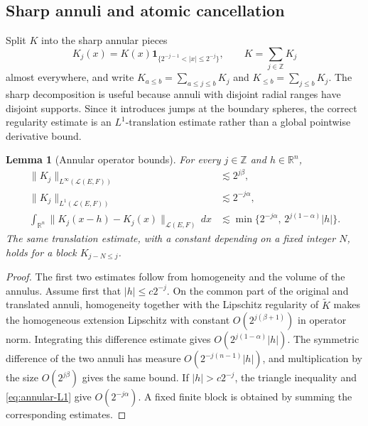 \documentclass[11pt]{amsart}
\numberwithin{equation}{section}
\newtheorem{lemma}[theorem]{Lemma}
\theoremstyle{definition}
\theoremstyle{remark}
\newcommand{\R}{\mathbb R}
\newcommand{\cL}{\mathcal L}
\newcommand{\norm}[1]{\lVert #1\rVert}
\begin{document}
\subsection{Sharp annuli and atomic cancellation}
Split $K$ into the sharp annular pieces
\begin{equation}\label{eq:annular-kernel}
 K_j(x)=K(x)\mathbf 1_{\{2^{-j-1}<|x|\le2^{-j}\}},
 \qquad K=\sum_{j\in\mathbb Z}K_j
\end{equation}
almost everywhere, and write $K_{a\le b}=\sum_{a\le j\le b}K_j$ and
$K_{\le b}=\sum_{j\le b}K_j$.  The sharp decomposition is useful because
annuli with disjoint radial ranges have disjoint supports.  Since it introduces
jumps at the boundary spheres, the correct regularity estimate is an
$L^1$-translation estimate rather than a global pointwise derivative bound.

\begin{lemma}[Annular operator bounds]\label{lem:annular-translation}
For every $j\in\mathbb Z$ and $h\in\R^n$,
\begin{align}
 \norm{K_j}_{L^\infty(\cL(E,F))}&\lesssim2^{j\beta},               \label{eq:annular-Linfty}\\
 \norm{K_j}_{L^1(\cL(E,F))}&\lesssim2^{-j\alpha},                 \label{eq:annular-L1}\\
 \int_{\R^n}\norm{K_j(x-h)-K_j(x)}_{\cL(E,F)}\,dx
 &\lesssim \min\{2^{-j\alpha},\,2^{j(1-\alpha)}|h|\}.           \label{eq:annular-translation}
\end{align}
The same translation estimate, with a constant depending on a fixed integer
$N$, holds for a block $K_{j-N\le j}$.
\end{lemma}

\begin{proof}
The first two estimates follow from homogeneity and the volume of the annulus.
Assume first that $|h|\le c2^{-j}$.  On the common part of the original and
translated annuli, homogeneity together with the Lipschitz regularity of
$\widetilde K$ makes the homogeneous extension Lipschitz with constant
$O(2^{j(\beta+1)})$ in operator norm.  Integrating this difference estimate
gives $O(2^{j(1-\alpha)}|h|)$.  The symmetric difference of the two annuli has
measure $O(2^{-j(n-1)}|h|)$, and multiplication by the size
$O(2^{j\beta})$ gives the same bound.  If $|h|>c2^{-j}$, the triangle
inequality and \eqref{eq:annular-L1} give $O(2^{-j\alpha})$.  A fixed finite
block is obtained by summing the corresponding estimates.
\end{proof}
\end{document}
